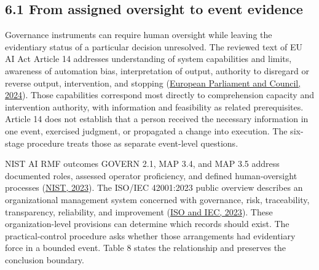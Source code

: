 \documentclass[11pt]{article}
\begin{document}
\subsection*{6.1 From assigned oversight to event evidence}
Governance instruments can require human oversight while leaving the evidentiary status of a particular decision unresolved. The reviewed text of EU AI Act Article 14 addresses understanding of system capabilities and limits, awareness of automation bias, interpretation of output, authority to disregard or reverse output, intervention, and stopping (\href{https://eur-lex.europa.eu/eli/reg/2024/1689/oj}{European Parliament and Council, 2024}). Those capabilities correspond most directly to comprehension capacity and intervention authority, with information and feasibility as related prerequisites. Article 14 does not establish that a person received the necessary information in one event, exercised judgment, or propagated a change into execution. The six-stage procedure treats those as separate event-level questions.

NIST AI RMF outcomes GOVERN 2.1, MAP 3.4, and MAP 3.5 address documented roles, assessed operator proficiency, and defined human-oversight processes (\href{https://airc.nist.gov/airmf-resources/airmf/5-sec-core/}{NIST, 2023}). The ISO/IEC 42001:2023 public overview describes an organizational management system concerned with governance, risk, traceability, transparency, reliability, and improvement (\href{https://www.iso.org/standard/42001}{ISO and IEC, 2023}). These organization-level provisions can determine which records should exist. The practical-control procedure asks whether those arrangements had evidentiary force in a bounded event. Table 8 states the relationship and preserves the conclusion boundary.
\end{document}

